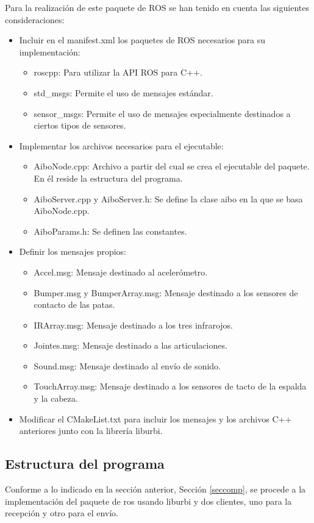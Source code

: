 \documentclass[12pt,a4paper,final,twoside]{book}
\begin{document}
Para la realización de este paquete de ROS se han tenido en cuenta las siguientes consideraciones:
\begin{itemize}
\item Incluir en el manifest.xml los paquetes de ROS necesarios para su implementación:
\begin{itemize}
\item roscpp: Para utilizar la API ROS para C++.
\item std{\_}msgs: Permite el uso de mensajes estándar.
\item sensor{\_}msgs: Permite el uso de mensajes especialmente destinados a ciertos tipos de sensores.
\end{itemize}
\item Implementar los archivos necesarios para el ejecutable:
\begin{itemize}
\item AiboNode.cpp: Archivo a partir del cual se crea el ejecutable del paquete. En él reside la estructura del programa.
\item AiboServer.cpp y AiboServer.h: Se define la clase aibo en la que se basa AiboNode.cpp.
\item AiboParams.h: Se definen las constantes.
\end{itemize} 
\item Definir los mensajes propios:
\begin{itemize}
\item Accel.msg: Mensaje destinado al acelerómetro.
\item Bumper.msg y BumperArray.msg: Mensaje destinado a los sensores de contacto de las patas.
\item IRArray.msg: Mensaje destinado a los tres infrarojos.
\item Jointes.msg: Mensaje destinado a las articulaciones.
\item Sound.msg: Mensaje destinado al envío de sonido.
\item TouchArray.msg: Mensaje destinado a los sensores de tacto de la espalda y la cabeza.
\end{itemize}
\item Modificar el CMakeList.txt para incluir los mensajes y los archivos C++ anteriores junto con la librería liburbi.
\end{itemize}

\subsection{Estructura del programa}
 Conforme a lo indicado en la sección anterior, Sección \ref{seccomp}, se procede a la implementación del paquete de ros usando liburbi y dos clientes, uno para la recepción  y otro para el envío.
\end{document}
